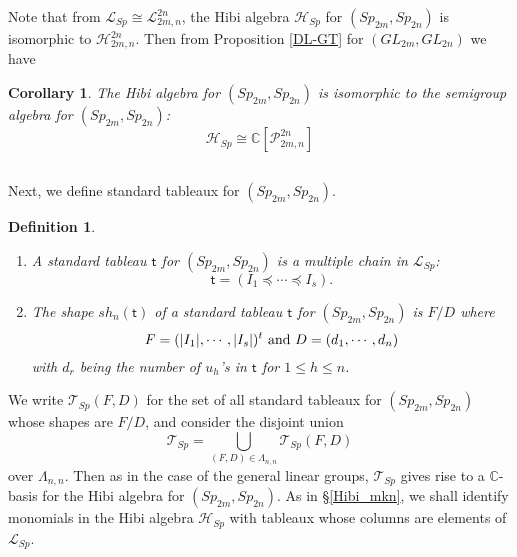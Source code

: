\documentclass[11pt]{amsart}
\numberwithin{equation}{subsection}
\newtheorem{corollary}[theorem]{Corollary}
\newtheorem{definition}[theorem]{Definition}
\begin{document}
Note that from $\mathcal{L}_{Sp} \cong \mathcal{L}_{2m, n}^{2n}$, 
the Hibi algebra $\mathcal{H}_{Sp}$ for $(Sp_{2m}, Sp_{2n})$ is isomorphic to 
$\mathcal{H}^{2n}_{2m,n}$. Then from Proposition \ref{DL-GT} for $(GL_{2m}, GL_{2n})$
we have

\begin{corollary}\label{Sp_Hibi_iso}
The Hibi algebra for $(Sp_{2m}, Sp_{2n})$ is isomorphic to 
the semigroup algebra for $(Sp_{2m}, Sp_{2n})$:
\begin{equation*}
\mathcal{H}_{Sp} \cong \mathbb{C}[\mathcal{P}_{2m,n}^{2n}]
\end{equation*}
\end{corollary}

\subsection{}
Next, we define standard tableaux for $(Sp_{2m}, Sp_{2n})$.

\begin{definition}\label{BrSp_standardtab}
\begin{enumerate}
\item A standard tableau $\mathsf{t}$ for $({Sp}_{2m},{Sp}_{2n})$ is a multiple
chain  in $\mathcal{L}_{Sp}$: $$\mathsf{t}=\left( I_{1}\preceq \cdots \preceq I_{s} \right).$$ 
\item The shape $sh_{n}(\mathsf{t})$ of a standard tableau $\mathsf{t}$ for 
$({Sp}_{2m},{Sp}_{2n})$ is $F/D$ where 
$$F=(|I_{1}|,\cdots ,|I_{s}|)^{t} \hbox{ and } D=(d_{1},\cdots ,d_{n})$$
with $d_{r}$ being the number of $u_h$'s in $\mathsf{t}$ for $1\leq h\leq n$.
\end{enumerate}
\end{definition}

We write $\mathcal{T}_{Sp}(F,D)$ for the set of all standard
tableaux for $({Sp}_{2m}, {Sp}_{2n})$ whose shapes are $F/D$, and consider
the disjoint union
\begin{equation*}
\mathcal{T}_{Sp}=\bigcup_{(F,D)\in \Lambda _{n,n}}\mathcal{T}_{Sp}(F,D)
\end{equation*}
over $\Lambda _{n,n}$. Then as in the case of the general linear groups, $\mathcal{T}_{Sp}$ 
gives rise to a $\mathbb{C}$-basis for the Hibi algebra for $({Sp}_{2m}, {Sp}_{2n})$.
As in \S \ref{Hibi_mkn}, we shall identify monomials in the Hibi algebra $\mathcal{H}_{Sp}$ 
with tableaux whose columns are elements of $\mathcal{L}_{Sp}$.
\end{document}

